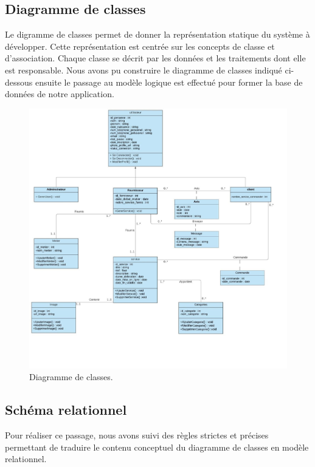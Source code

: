 \documentclass[french]{report}
\begin{document}
        \subsection{Diagramme de classes}
        Le digramme de classes permet de donner la représentation statique du système à développer. 
	Cette représentation est centrée sur les concepts de classe et d'association. 
	Chaque classe se décrit par les données et les traitements dont elle est responsable.
	Nous avons pu construire le diagramme de classes indiqué ci-dessous ensuite le passage au modèle 
	logique est effectué pour former la base de données de notre application.
          \begin{figure}[H]
            \centering
            \includegraphics[width=1\textwidth]{images/Diag de classe.jpg}
            \caption{Diagramme de classes.}
            \label{fig:my_label}
        \end{figure}

        \subsection{Schéma relationnel}
        Pour réaliser ce passage, nous avons suivi des règles strictes et précises permettant 
	de traduire le contenu conceptuel du diagramme de classes en modèle relationnel.
\end{document}
